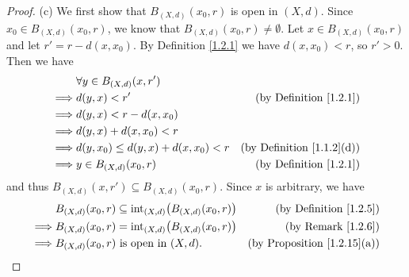 \begin{proof}{(c)}
    We first show that \(B_{(X, d)}(x_0, r)\) is open in \((X, d)\).
    Since \(x_0 \in B_{(X, d)}(x_0, r)\), we know that \(B_{(X, d)}(x_0, r) \neq \emptyset\).
    Let \(x \in B_{(X, d)}(x_0, r)\) and let \(r' = r - d(x, x_0)\).
    By Definition \ref{1.2.1} we have \(d(x, x_0) < r\), so \(r' > 0\).
    Then we have
    \begin{align*}
                 & \forall y \in B_{(X, d)}(x, r')                                                \\
        \implies & d(y, x) < r'                           & \text{(by Definition \ref{1.2.1})}    \\
        \implies & d(y, x) < r - d(x, x_0)                                                        \\
        \implies & d(y, x) + d(x, x_0) < r                                                        \\
        \implies & d(y, x_0) \leq d(y, x) + d(x, x_0) < r & \text{(by Definition \ref{1.1.2}(d))} \\
        \implies & y \in B_{(X, d)}(x_0, r)               & \text{(by Definition \ref{1.2.1})}
    \end{align*}
    and thus \(B_{(X, d)}(x, r') \subseteq B_{(X, d)}(x_0, r)\).
    Since \(x\) is arbitrary, we have
    \begin{align*}
                 & B_{(X, d)}(x_0, r) \subseteq \text{int}_{(X, d)}\big(B_{(X, d)}(x_0, r)\big) & \text{(by Definition \ref{1.2.5})}      \\
        \implies & B_{(X, d)}(x_0, r) = \text{int}_{(X, d)}\big(B_{(X, d)}(x_0, r)\big)         & \text{(by Remark \ref{1.2.6})}          \\
        \implies & B_{(X, d)}(x_0, r) \text{ is open in } (X, d).                               & \text{(by Proposition \ref{1.2.15}(a))}
    \end{align*}


\end{proof}
